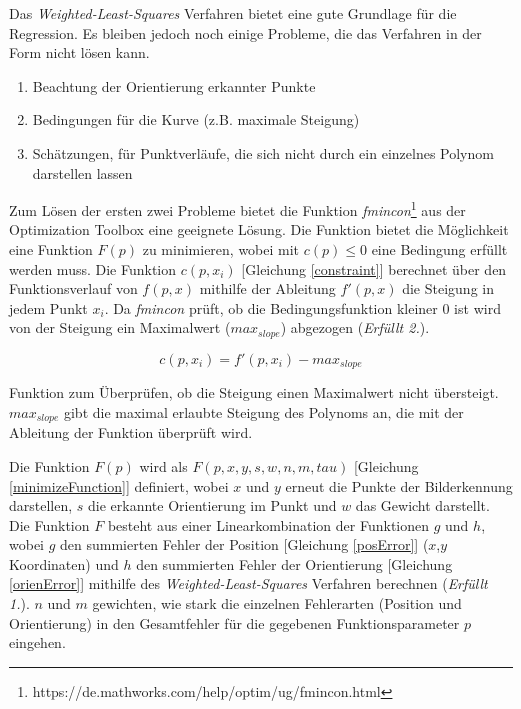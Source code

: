 Das \textit{Weighted-Least-Squares} Verfahren bietet eine gute Grundlage für die Regression. Es bleiben jedoch noch einige Probleme, die das Verfahren in der Form nicht lösen kann.
\begin{enumerate}
\item Beachtung der Orientierung erkannter Punkte
\item Bedingungen für die Kurve (z.B. maximale Steigung)
\item Schätzungen, für Punktverläufe, die sich nicht durch ein einzelnes Polynom darstellen lassen
\end{enumerate}

Zum Lösen der ersten zwei Probleme bietet die \matlab Funktion \textit{fmincon}\footnote{https://de.mathworks.com/help/optim/ug/fmincon.html} aus der Optimization Toolbox eine geeignete Lösung. Die Funktion bietet die Möglichkeit eine Funktion $F(p)$ zu minimieren, wobei mit $c(p) \leq 0$ eine Bedingung erfüllt werden muss. Die Funktion $c(p,x_i)$ [Gleichung \ref{constraint}] berechnet über den Funktionsverlauf von $f(p,x)$ mithilfe der Ableitung $f'(p,x)$ die Steigung in jedem Punkt $x_i$. Da \textit{fmincon} prüft, ob die Bedingungsfunktion kleiner 0 ist wird von der Steigung ein Maximalwert ($max_{slope}$) abgezogen (\textit{Erfüllt 2.}).\\
\begin{ownequation}[H]
\begin{equation}
c(p,x_i) = f'(p,x_i)-max_{slope}
\end{equation}
\caption[Funktion zum Überprüfen, ob die Steigung einen Maximalwert nicht übersteigt.]{Funktion zum Überprüfen, ob die Steigung einen Maximalwert nicht übersteigt. $max_{slope}$ gibt die maximal erlaubte Steigung des Polynoms an, die mit der Ableitung der Funktion überprüft wird.}
\label{constraint}
\end{ownequation}
Die Funktion $F(p)$ wird als $F(p,x,y,s,w,n,m,tau)$ [Gleichung \ref{minimizeFunction}] definiert, wobei $x$ und $y$ erneut die Punkte der Bilderkennung darstellen, $s$ die erkannte Orientierung im Punkt und $w$ das Gewicht darstellt. Die Funktion $F$ besteht aus einer Linearkombination der Funktionen $g$ und $h$, wobei $g$ den summierten Fehler der Position [Gleichung \ref{posError}] ($x$,$y$ Koordinaten) und $h$ den summierten Fehler der Orientierung [Gleichung \ref{orienError}] mithilfe des \textit{Weighted-Least-Squares} Verfahren berechnen (\textit{Erfüllt 1.}). $n$ und $m$ gewichten, wie stark die einzelnen Fehlerarten (Position und Orientierung) in den Gesamtfehler für die gegebenen Funktionsparameter $p$ eingehen.\\
